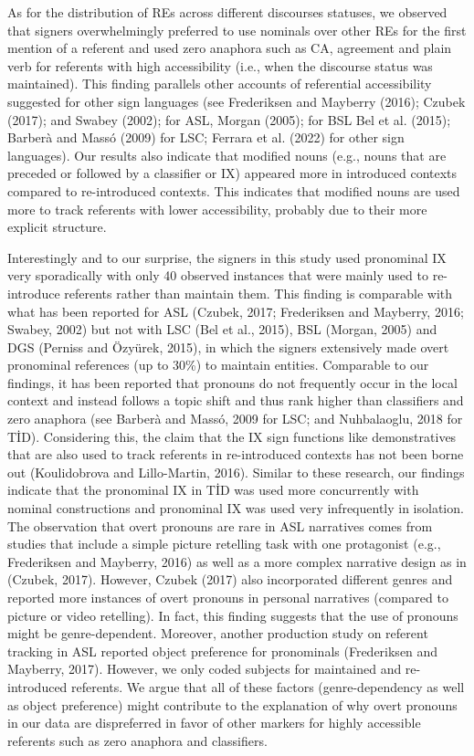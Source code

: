 \documentclass[]{elsarticle} %
\begin{document}
As for the distribution of REs across different discourses statuses, we
observed that signers overwhelmingly preferred to use nominals over
other REs for the first mention of a referent and used zero anaphora
such as CA, agreement and plain verb for referents with high
accessibility (i.e., when the discourse status was maintained). This
finding parallels other accounts of referential accessibility suggested
for other sign languages (see Frederiksen and Mayberry (2016); Czubek
(2017); and Swabey (2002); for ASL, Morgan (2005); for BSL Bel et al.
(2015); Barberà and Massó (2009) for LSC; Ferrara et al. (2022) for
other sign languages). Our results also indicate that modified nouns
(e.g., nouns that are preceded or followed by a classifier or IX)
appeared more in introduced contexts compared to re-introduced contexts.
This indicates that modified nouns are used more to track referents with
lower accessibility, probably due to their more explicit structure.

Interestingly and to our surprise, the signers in this study used
pronominal IX very sporadically with only 40 observed instances that
were mainly used to re-introduce referents rather than maintain them.
This finding is comparable with what has been reported for ASL (Czubek,
2017; Frederiksen and Mayberry, 2016; Swabey, 2002) but not with LSC
(Bel et al., 2015), BSL (Morgan, 2005) and DGS (Perniss and Özyürek,
2015), in which the signers extensively made overt pronominal references
(up to 30\%) to maintain entities. Comparable to our findings, it has
been reported that pronouns do not frequently occur in the local context
and instead follows a topic shift and thus rank higher than classifiers
and zero anaphora (see Barberà and Massó, 2009 for LSC; and Nuhbalaoglu,
2018 for TİD). Considering this, the claim that the IX sign functions
like demonstratives that are also used to track referents in
re-introduced contexts has not been borne out (Koulidobrova and
Lillo-Martin, 2016). Similar to these research, our findings indicate
that the pronominal IX in TİD was used more concurrently with nominal
constructions and pronominal IX was used very infrequently in isolation.
The observation that overt pronouns are rare in ASL narratives comes
from studies that include a simple picture retelling task with one
protagonist (e.g., Frederiksen and Mayberry, 2016) as well as a more
complex narrative design as in (Czubek, 2017). However, Czubek (2017)
also incorporated different genres and reported more instances of overt
pronouns in personal narratives (compared to picture or video
retelling). In fact, this finding suggests that the use of pronouns
might be genre-dependent. Moreover, another production study on referent
tracking in ASL reported object preference for pronominals (Frederiksen
and Mayberry, 2017). However, we only coded subjects for maintained and
re-introduced referents. We argue that all of these factors
(genre-dependency as well as object preference) might contribute to the
explanation of why overt pronouns in our data are dispreferred in favor
of other markers for highly accessible referents such as zero anaphora
and classifiers.
\end{document}
